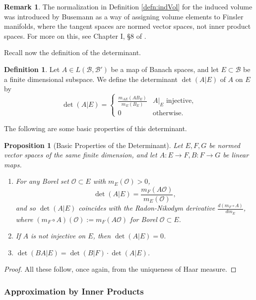 \documentclass[11pt]{amsart}
\theoremstyle{theorem}
\newtheorem{prop}[thm]{Proposition}
\theoremstyle{definition}
\newtheorem{defn}[thm]{Definition}
\newtheorem{rmk}[thm]{Remark}
\numberwithin{equation}{section}
\newcommand{\Bc}{\mathcal{B}}
\newcommand{\Oc}{\mathcal{O}}
\begin{document}
\begin{rmk}
The normalization in Definition \ref{defn:indVol} for the induced volume was introduced by Busemann \cite{B} as a way of assigning volume elements to Finsler manifolds, where the tangent spaces are normed vector spaces, not inner product spaces. For more on this, see Chapter I, \S 8 of \cite{Ru}.
\end{rmk}

Recall now the definition of the determinant.
\begin{defn}\label{defn:det}
Let $A \in L(\Bc, \Bc')$ be a map of Banach spaces, and let $E \subset \Bc$ be a finite dimensional subspace. We define the determinant $\det(A | E)$ of $A$ on $E$ by
\[
\det (A|E) = 
\begin{cases}
\frac{m_{A E}(A B_E)}{m_E(B_E)} & A|_E \text{ injective,} \\
0 & \text{otherwise.}
\end{cases}
\]
\end{defn}

The following are some basic properties of this determinant.
\begin{prop}[Basic Properties of the Determinant] \label{prop:detProps}
Let $E, F, G$ be normed vector spaces of the same finite dimension, and let $A : E \to F, B : F \to G$ be linear maps.
\begin{enumerate}
\item For any Borel set $\Oc \subset E$ with $m_E (\Oc) > 0$,
$$
\det (A|E) = \frac{m_F(A \Oc)}{m_E(\Oc)},
$$
and so $\det(A | E)$ coincides with the Radon-Nikodym derivative $\frac{d (m_F \circ A)}{d m_E}$, where $(m_F \circ A)(\Oc) := m_F(A \Oc)$ for Borel $\Oc \subset E$.
\item If $A$ is not injective on $E$, then $\det (A | E) = 0$.
\item $\det (B A | E) = \det (B| F) \cdot \det (A | E)$.
\end{enumerate}
\end{prop}
\begin{proof}
All these follow, once again, from the uniqueness of Haar measure.
\end{proof}


\subsubsection{Approximation by Inner Products}
\end{document}
